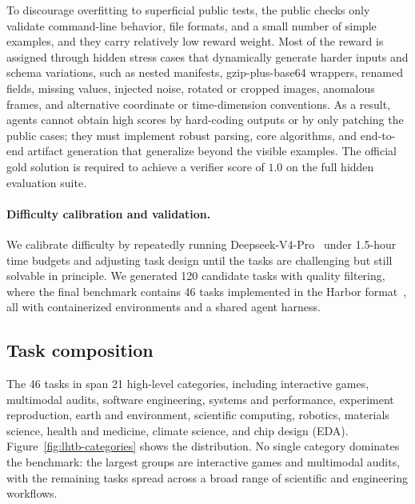 To discourage overfitting to superficial public tests, the public checks only validate command-line behavior, file formats, and a small number of simple examples, and they carry relatively low reward weight.
Most of the reward is assigned through hidden stress cases that dynamically generate harder inputs and schema variations, such as nested manifests, gzip-plus-base64 wrappers, renamed fields, missing values, injected noise, rotated or cropped images, anomalous frames, and alternative coordinate or time-dimension conventions.
As a result, agents cannot obtain high scores by hard-coding outputs or by only patching the public cases; they must implement robust parsing, core algorithms, and end-to-end artifact generation that generalize beyond the visible examples.
The official gold solution is required to achieve a verifier score of $1.0$ on the full hidden evaluation suite.

\paragraph{Difficulty calibration and validation.} We calibrate difficulty by repeatedly running Deepseek-V4-Pro~\cite{deepseekai2026deepseekv4} under 1.5-hour time budgets and adjusting task design until the tasks are challenging but still solvable in principle.
%
We generated 120 candidate tasks with quality filtering, where the final benchmark contains 46 tasks implemented in the Harbor format~\cite{merrill2026terminalbenchbenchmarkingagentshard}, all with containerized environments and a shared agent harness.

\subsection{Task composition}

The 46 tasks in \ours{} span 21 high-level categories, including interactive games, multimodal audits, software engineering, systems and performance, experiment reproduction, earth and environment, scientific computing, robotics, materials science, health and medicine, climate science, and chip design (EDA).
Figure~\ref{fig:lhtb-categories} shows the distribution.
No single category dominates the benchmark: the largest groups are interactive games and multimodal audits, with the remaining tasks spread across a broad range of scientific and engineering workflows.